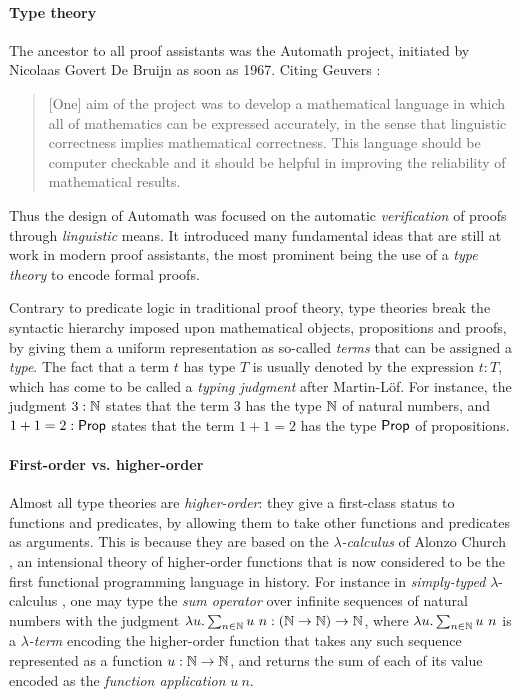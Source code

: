 \paragraph{Type theory}

The ancestor to all proof assistants was the Automath project, initiated by
Nicolaas Govert De Bruijn as soon as 1967. Citing Geuvers
:
\begin{quote}
[One] aim of the project was to develop a mathematical language in which all of
mathematics can be expressed accurately, in the sense that linguistic
correctness implies mathematical correctness. This language should be computer
checkable and it should be helpful in improving the reliability of mathematical
results.
\end{quote}
Thus the design of Automath was focused on the automatic \emph{verification} of
proofs through \emph{linguistic} means. It introduced many fundamental ideas
that are still at work in modern proof assistants, the most prominent being the
use of a \emph{type theory} to encode formal proofs.

Contrary to predicate logic in traditional proof theory, type theories break the
syntactic hierarchy imposed upon mathematical objects, propositions and proofs,
by giving them a uniform representation as so-called \emph{terms} that can be
assigned a \emph{type}. The fact that a term $t$ has type $T$ is usually denoted
by the expression $t : T$, which has come to be called a \emph{typing judgment}
after Martin-Löf. For instance, the judgment $3 : \mathbb{N}$ states that the term
$3$ has the type $\mathbb{N}$ of natural numbers, and $1 + 1 = 2 : \mathsf{Prop}$ states that
the term $1 + 1 = 2$ has the type $\mathsf{Prop}$ of propositions.

\paragraph{First-order vs. higher-order}

Almost all type theories are \emph{higher-order}: they give a first-class status
to functions and predicates, by allowing them to take other functions and
predicates as arguments. This is because they are based on the
\emph{$\lambda$-calculus} of Alonzo Church
, an intensional theory of
higher-order functions that is now considered to be the first functional
programming language in history. For instance in \emph{simply-typed}
$\lambda$-calculus , one may type
the \emph{sum operator} over infinite sequences of natural numbers with the
judgment $\lambda u. \sum_{n \in \mathbb{N}}{u~n} : (\mathbb{N} \to \mathbb{N}) \to \mathbb{N}$,
where $\lambda u. \sum_{n \in \mathbb{N}}{u~n}$ is a \emph{$\lambda$-term} encoding
the higher-order function that takes any such sequence represented as a function
$u : \mathbb{N} \to \mathbb{N}$, and returns the sum of each of its value encoded as the
\emph{function application} $u~n$.

